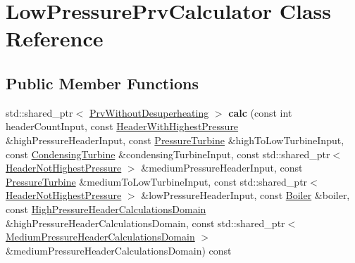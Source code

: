 \hypertarget{class_low_pressure_prv_calculator}{}\section{Low\+Pressure\+Prv\+Calculator Class Reference}
\label{class_low_pressure_prv_calculator}
\subsection*{Public Member Functions}
\begin{DoxyCompactItemize}
\item 
\mbox{\label{class_low_pressure_prv_calculator_af3173af2f59f6b7b2202adfa06e3d03d}} 
std\+::shared\+\_\+ptr$<$ \hyperlink{class_prv_without_desuperheating}{Prv\+Without\+Desuperheating} $>$ {\bfseries calc} (const int header\+Count\+Input, const \hyperlink{class_header_with_highest_pressure}{Header\+With\+Highest\+Pressure} \&high\+Pressure\+Header\+Input, const \hyperlink{class_pressure_turbine}{Pressure\+Turbine} \&high\+To\+Low\+Turbine\+Input, const \hyperlink{class_condensing_turbine}{Condensing\+Turbine} \&condensing\+Turbine\+Input, const std\+::shared\+\_\+ptr$<$ \hyperlink{class_header_not_highest_pressure}{Header\+Not\+Highest\+Pressure} $>$ \&medium\+Pressure\+Header\+Input, const \hyperlink{class_pressure_turbine}{Pressure\+Turbine} \&medium\+To\+Low\+Turbine\+Input, const std\+::shared\+\_\+ptr$<$ \hyperlink{class_header_not_highest_pressure}{Header\+Not\+Highest\+Pressure} $>$ \&low\+Pressure\+Header\+Input, const \hyperlink{class_boiler}{Boiler} \&boiler, const \hyperlink{class_high_pressure_header_calculations_domain}{High\+Pressure\+Header\+Calculations\+Domain} \&high\+Pressure\+Header\+Calculations\+Domain, const std\+::shared\+\_\+ptr$<$ \hyperlink{class_medium_pressure_header_calculations_domain}{Medium\+Pressure\+Header\+Calculations\+Domain} $>$ \&medium\+Pressure\+Header\+Calculations\+Domain) const
\item 
\mbox{\label{class_low_pressure_prv_calculator_ae120bafe2b52acee5aafc40b928e2b1b}} 

\end{DoxyCompactItemize}
